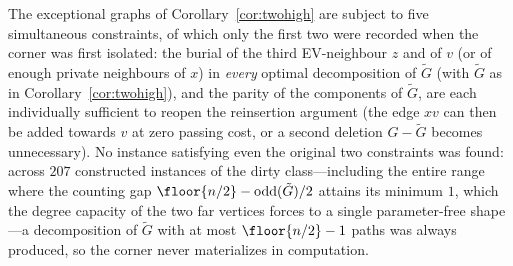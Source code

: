 \begin{remark}
The exceptional graphs of Corollary~\ref{cor:twohigh} are subject to five simultaneous
constraints, of which only the first two were recorded when the corner was first isolated:
the burial of the third EV-neighbour $z$ and of $v$ (or of enough private neighbours of $x$)
in \emph{every} optimal decomposition of $\tilde G$ (with $\tilde G$ as in
Corollary~\ref{cor:twohigh}), and the parity of the components of $\tilde G$, are each
individually sufficient to reopen the reinsertion argument (the edge $xv$ can then be added
towards $v$ at zero passing cost, or a second deletion $G-\tilde G$ becomes unnecessary). No
instance satisfying even the original two constraints was found: across $207$ constructed
instances of the dirty class---including the entire range where the counting gap
$\floor{n/2}-\mathrm{odd}(\tilde G)/2$ attains its minimum $1$, which the degree capacity of
the two far vertices forces to a single parameter-free shape---a decomposition of $\tilde G$
with at most $\floor{n/2}-1$ paths was always produced, so the corner never materializes in
computation.


\end{remark}
